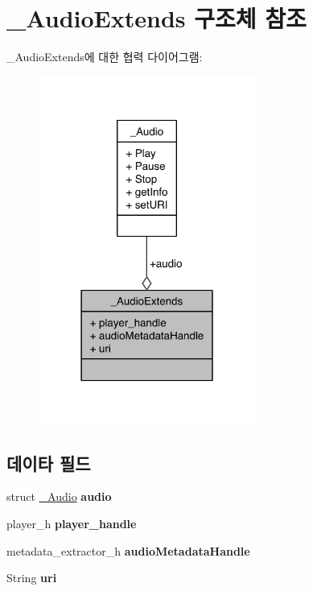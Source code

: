 \hypertarget{struct__AudioExtends}{\section{\-\_\-\-Audio\-Extends 구조체 참조}
\label{struct__AudioExtends}
}


\-\_\-\-Audio\-Extends에 대한 협력 다이어그램\-:\nopagebreak
\begin{figure}[H]
\begin{center}
\leavevmode
\includegraphics[width=202pt]{d6/db9/struct__AudioExtends__coll__graph}
\end{center}
\end{figure}
\subsection*{데이타 필드}
\begin{DoxyCompactItemize}
\item 
\hypertarget{struct__AudioExtends_a5fd9dfc5896f2475249e5814bc957cd3}{struct \hyperlink{struct__Audio}{\-\_\-\-Audio} {\bfseries audio}}\label{struct__AudioExtends_a5fd9dfc5896f2475249e5814bc957cd3}

\item 
\hypertarget{struct__AudioExtends_acdbf0738be9fa70a60412d48cad881ee}{player\-\_\-h {\bfseries player\-\_\-handle}}\label{struct__AudioExtends_acdbf0738be9fa70a60412d48cad881ee}

\item 
\hypertarget{struct__AudioExtends_afb8274c680a31f19a7967b768e11ba52}{metadata\-\_\-extractor\-\_\-h {\bfseries audio\-Metadata\-Handle}}\label{struct__AudioExtends_afb8274c680a31f19a7967b768e11ba52}

\item 
\hypertarget{struct__AudioExtends_ac0b02717b928a36338653c49b0821365}{String {\bfseries uri}}\label{struct__AudioExtends_ac0b02717b928a36338653c49b0821365}

\end{DoxyCompactItemize}


